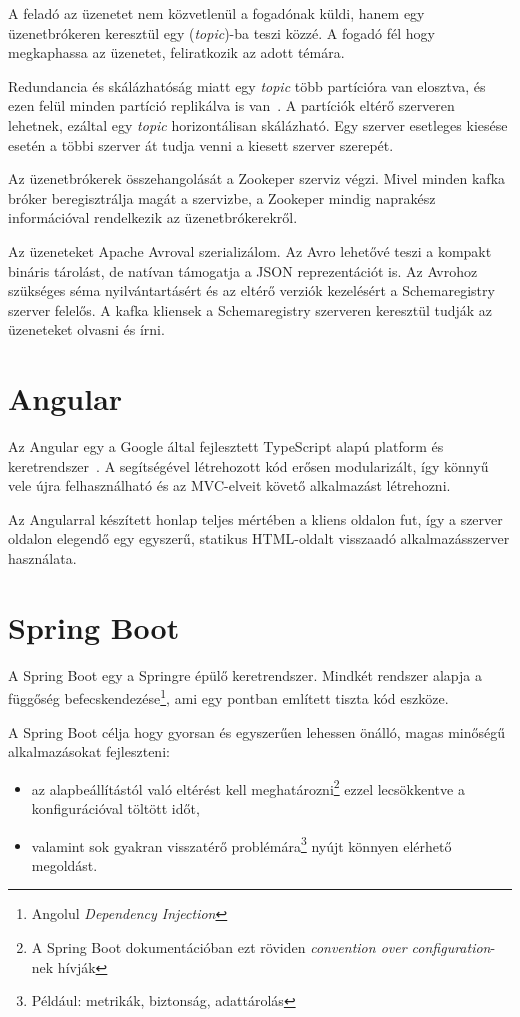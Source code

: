 A feladó az üzenetet nem közvetlenül a fogadónak küldi, hanem egy üzenetbrókeren keresztül egy (\textit{topic})-ba teszi közzé. A fogadó fél hogy megkaphassa az üzenetet, feliratkozik az adott témára. 

Redundancia és skálázhatóság miatt egy \textit{topic} több partícióra van elosztva, és ezen felül minden partíció replikálva is van~\cite{OReally_Kafka_Internals}. A partíciók eltérő szerveren lehetnek, ezáltal egy \textit{topic} horizontálisan skálázható. Egy szerver esetleges kiesése esetén a többi szerver át tudja venni a kiesett szerver szerepét.

Az üzenetbrókerek összehangolását a Zookeper szerviz végzi. Mivel minden kafka bróker beregisztrálja magát a szervizbe, a Zookeper mindig naprakész információval rendelkezik az üzenetbrókerekről.

Az üzeneteket Apache Avroval szerializálom. Az Avro lehetővé teszi a kompakt bináris tárolást, de natívan támogatja a JSON reprezentációt is. Az Avrohoz szükséges séma nyilvántartásért és az eltérő verziók kezelésért a Schemaregistry szerver felelős. A kafka kliensek a Schemaregistry szerveren keresztül tudják az üzeneteket olvasni és írni. 



\section{Angular}\label{sec:angular}
Az \foreignlanguage{british}{Angular} egy a \foreignlanguage{british}{Google} által fejlesztett \foreignlanguage{british}{TypeScript} alapú platform és	keretrendszer~\cite{angular_docs}. A segítségével létrehozott kód erősen modularizált, így könnyű vele újra felhasználható és az MVC-elveit követő alkalmazást létrehozni.

Az Angularral készített honlap teljes mértében a kliens oldalon fut, így a szerver oldalon elegendő egy egyszerű, statikus HTML-oldalt visszaadó alkalmazásszerver használata.


\section{Spring Boot}\label{sec:spring_boot}
A \foreignlanguage{british}{Spring Boot} egy a Springre épülő keretrendszer. Mindkét rendszer alapja a függőség befecskendezése\footnote{Angolul \foreignlanguage{british}{\textit{Dependency Injection}}}, ami egy  pontban említett tiszta kód \cite{clean_code_chapter_systems} eszköze.

A Spring Boot \cite{introducing_spring_boot} célja hogy gyorsan és egyszerűen lehessen önálló, magas minőségű alkalmazásokat fejleszteni:
\begin{itemize}
	\item az alapbeállítástól való eltérést kell meghatározni\footnote{A Spring Boot dokumentációban ezt röviden \textit{convention over configuration}-nek hívják} ezzel lecsökkentve a konfigurációval töltött időt,
	\item valamint sok gyakran visszatérő problémára\footnote{Például: metrikák, biztonság, adattárolás} nyújt könnyen elérhető megoldást.
\end{itemize}



